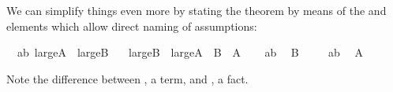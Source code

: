 \begin{isabellebody}
\begin{isamarkuptext}
We can simplify things even more by stating the theorem by means of the
 and  elements which allow direct
naming of assumptions:%
\end{isamarkuptext}%
\isamarkuptrue%
\isamarkupfalse%
\ \ ab{\isacharcolon}\ {\isachardoublequoteopen}large{\isacharunderscore}A\ {\isasymand}\ large{\isacharunderscore}B{\isachardoublequoteclose}\isanewline
\ \ \ {\isachardoublequoteopen}large{\isacharunderscore}B\ {\isasymand}\ large{\isacharunderscore}A{\isachardoublequoteclose}\ {\isacharparenleft}\ {\isachardoublequoteopen}{\isacharquery}B\ {\isasymand}\ {\isacharquery}A{\isachardoublequoteclose}{\isacharparenright}\isanewline
%
\isadelimproof
%
\endisadelimproof
%
\isatagproof
{}\isamarkupfalse%
\isanewline
\ \ \isamarkupfalse%
\ ab\ \isamarkupfalse%
\ {\isachardoublequoteopen}{\isacharquery}B{\isachardoublequoteclose}\ \isacommand{{\isachardot}{\isachardot}}\isamarkupfalse%
\isanewline
{}\isamarkupfalse%
\isanewline
\ \ \isamarkupfalse%
\ ab\ \isamarkupfalse%
\ {\isachardoublequoteopen}{\isacharquery}A{\isachardoublequoteclose}\ \isacommand{{\isachardot}{\isachardot}}\isamarkupfalse%
\isanewline
{}\isamarkupfalse%
%
\endisatagproof
{\isafoldproof}%
%
\isadelimproof
%
\endisadelimproof
%
\begin{isamarkuptext}%
\noindent Note the difference between , a term, and
, a fact.


\end{isamarkuptext}
\end{isabellebody}
